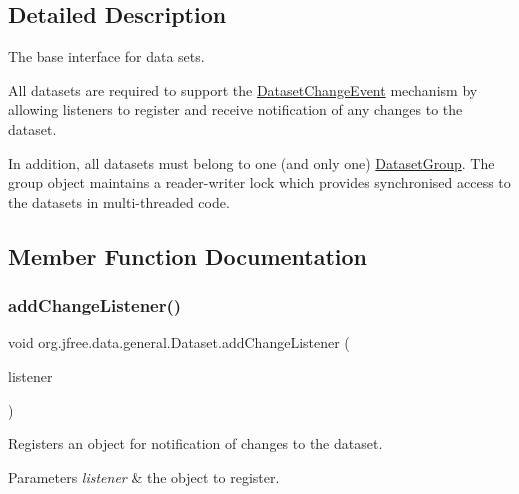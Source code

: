 \subsection{Detailed Description}
The base interface for data sets. 

All datasets are required to support the \mbox{\hyperlink{classorg_1_1jfree_1_1data_1_1general_1_1_dataset_change_event}{Dataset\+Change\+Event}} mechanism by allowing listeners to register and receive notification of any changes to the dataset. 

In addition, all datasets must belong to one (and only one) \mbox{\hyperlink{classorg_1_1jfree_1_1data_1_1general_1_1_dataset_group}{Dataset\+Group}}. The group object maintains a reader-\/writer lock which provides synchronised access to the datasets in multi-\/threaded code. 

\subsection{Member Function Documentation}
\mbox{\label{interfaceorg_1_1jfree_1_1data_1_1general_1_1_dataset_a34655e538642314586d5c92a4c055c4d}} 
\subsubsection{\texorpdfstring{add\+Change\+Listener()}{addChangeListener()}}
{\footnotesize\ttfamily void org.\+jfree.\+data.\+general.\+Dataset.\+add\+Change\+Listener (\begin{DoxyParamCaption}\item[{\mbox{\hyperlink{interfaceorg_1_1jfree_1_1data_1_1general_1_1_dataset_change_listener}{Dataset\+Change\+Listener}}}]{listener }\end{DoxyParamCaption})}

Registers an object for notification of changes to the dataset.


\begin{DoxyParams}{Parameters}
{\em listener} & the object to register. \\
\hline
\end{DoxyParams}


